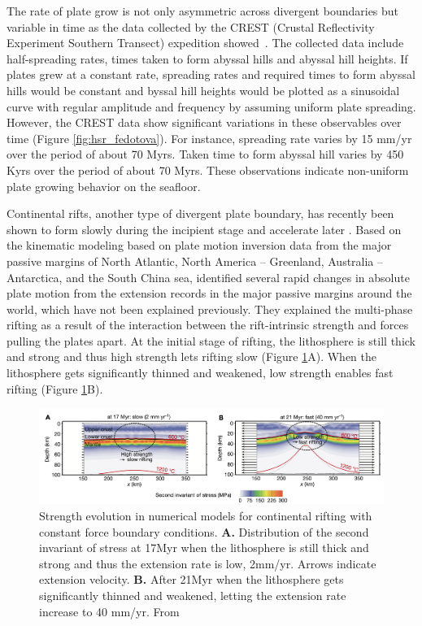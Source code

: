 \documentclass[letterpaper,12pt,notitle]{memphisthesis}                     %
\begin{document}
The rate of plate grow is not only asymmetric across divergent boundaries but variable in time as the data collected by the CREST (Crustal Reflectivity Experiment Southern Transect) expedition showed~\citep{Fedotova2017}. The collected data include half-spreading rates, times taken to form abyssal hills and abyssal hill heights. If plates grew at a constant rate, spreading rates and required times to form abyssal hills would be constant and byssal hill heights would be plotted as a sinusoidal curve with regular amplitude and frequency by assuming uniform plate spreading. However, the CREST data show significant variations in these observables over time (Figure \ref{fig:hsr_fedotova}). For instance, spreading rate varies by 15 mm/yr over the period of about 70 Myrs. Taken time to form abyssal hill varies by 450 Kyrs over the period of about 70 Myrs. These observations indicate non-uniform plate growing behavior on the seafloor.


Continental rifts, another type of divergent plate boundary, has recently been shown to form slowly during the incipient stage and accelerate later \citep{Brune2016}. Based on the kinematic modeling based on plate motion inversion data from the major passive margins of North Atlantic, North America – Greenland, Australia – Antarctica, and the South China sea, \citet{Brune2016} identified several rapid changes in absolute plate motion from the extension records in the major passive margins around the world, which have not been explained previously. They explained the multi-phase rifting as a result of the interaction between the rift-intrinsic strength and forces pulling the plates apart. At the initial stage of rifting, the lithosphere is still thick and strong and thus high strength lets rifting slow (Figure \ref{fig:brune}A). When the lithosphere gets significantly thinned and weakened, low strength enables fast rifting (Figure \ref{fig:brune}B).
%
\begin{figure}[!htb]
	\centering
	\includegraphics[width=0.99\linewidth]{./figs/brune.png}
	\caption{Strength evolution in numerical models for continental rifting with constant force boundary conditions. \textbf{A.} Distribution of the second invariant of stress at 17Myr when the lithosphere is still thick and strong and thus the extension rate is low, 2mm/yr. Arrows indicate extension velocity. \textbf{B.} After 21Myr when the lithosphere gets significantly thinned and weakened, letting the extension rate increase to 40 mm/yr. From \citet{Brune2016}}
	\label{fig:brune}
\end{figure}
\end{document}
